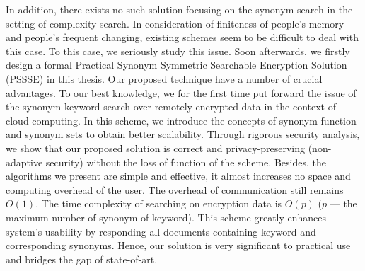 \begin{englishabstract}
  In addition, there exists no such solution focusing on the synonym search in the setting of complexity search. In consideration of finiteness of people's memory and people's frequent changing, existing schemes seem to be difficult to deal with this case. To this case, we seriously study this issue. Soon afterwards, we firstly design a formal Practical Synonym Symmetric Searchable Encryption Solution (PSSSE) in this thesis. Our proposed technique have a number of crucial advantages. To our best knowledge, we for the first time put forward the issue of the synonym keyword search over remotely encrypted data in the context of cloud computing. In this scheme, we introduce the concepts of synonym function and synonym sets to obtain better scalability. Through rigorous security analysis, we show that our proposed solution is correct and privacy-preserving (non-adaptive security) without the loss of function of the scheme. Besides, the algorithms we present are simple and effective, it almost increases no space and computing overhead of the user. The overhead of communication still remains $O(1)$. The time complexity of searching on encryption data is $O(p)$ ($p$ --- the maximum number of synonym of keyword). This scheme greatly enhances system's usability by responding all documents containing keyword and corresponding synonyms. Hence, our solution is very significant to practical use and bridges the gap of state-of-art.


\end{englishabstract}
